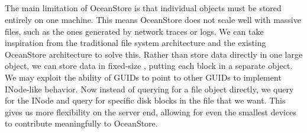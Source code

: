 \documentclass{article}
\begin{document}
\subsection{}
The main limitation of OceanStore is that individual objects must be stored entirely on one machine. This means OceanStore does not scale well with massive files, such as the ones generated by network traces or logs. We can take inspiration from the traditional file system architecture and the existing OceanStore architecture to solve this. Rather than store data directly in one large object, we can store data in fixed-size , putting each block in a separate object. We may exploit the ability of GUIDs to point to other GUIDs to implement INode-like behavior. Now instead of querying for a file object directly, we query for the INode and query for specific disk blocks in the file that we want. This gives us more flexibility on the server end, allowing for even the smallest devices to contribute meaningfully to OceanStore.
\end{document}
